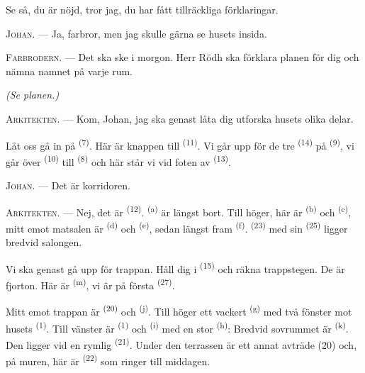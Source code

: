 Se så, du är nöjd, tror jag, du har fått tillräckliga förklaringar.

\textsc{Johan}. --- Ja, farbror, men jag skulle gärna se husets insida.

\textsc{Farbrodern}. --- Det ska ske i morgon. Herr Rödh ska förklara planen för dig och nämna
namnet på varje rum.

\VUsaut{3.0mm}
\VUsaut{2.4mm}

{\centering\textit{(Se planen.)}\par}
\VUsaut{2.4mm}

\textsc{Arkitekten}. --- Kom, Johan, jag ska genast låta dig utforska husets olika delar.

Låt oss gå in på  \textsuperscript{(7)}. Här är knappen till
 \textsuperscript{(11)}. Vi går upp för de tre
 \textsuperscript{(14)} på 
\textsuperscript{(9)}, vi går över  \textsuperscript{(10)} till
 \textsuperscript{(8)} och här står vi vid foten av
 \textsuperscript{(13)}.

\textsc{Johan}. --- Det är korridoren.

\textsc{Arkitekten}. --- Nej, det är  \textsuperscript{(12)}.
 \textsuperscript{(a)} är längst bort. Till höger, här är
 \textsuperscript{(b)} och 
\textsuperscript{(c)}, mitt emot matsalen är  \textsuperscript{(d)} och
 \textsuperscript{(e)}, sedan längst fram 
\textsuperscript{(f)}.  \textsuperscript{(23)} med sin 
\textsuperscript{(25)} ligger bredvid salongen.

Vi ska genast gå upp för trappan. Håll dig i  \textsuperscript{(15)} och
räkna trappstegen. De är fjorton. Här är
 \textsuperscript{(m)}, vi är på första 
\textsuperscript{(27)}.

\VUsaut{3.0mm}
\VUsaut{3.0mm}

Mitt emot trappan är  \textsuperscript{(20)} och
 \textsuperscript{(j)}. Till höger ett vackert
 \textsuperscript{(g)} med två fönster mot husets
 \textsuperscript{(1)}. Till vänster är 
\textsuperscript{(1)} och  \textsuperscript{(i)} med en stor
 \textsuperscript{(h)}: Bredvid sovrummet är
 \textsuperscript{(k)}. Den ligger vid en rymlig
 \textsuperscript{(21)}. Under den terrassen är ett annat avträde
(20) och, på muren, här är  \textsuperscript{(22)} som ringer till middagen.

